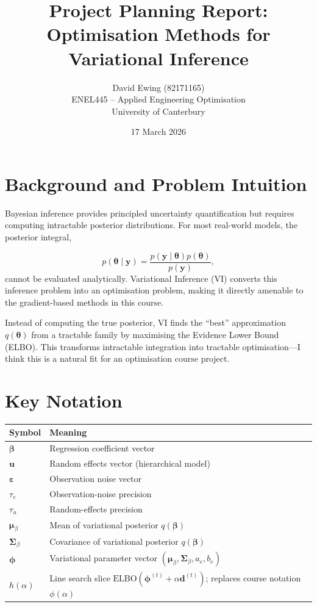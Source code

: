 \documentclass[11pt]{article}
\title{Project Planning Report:\\
Optimisation Methods for Variational Inference}
\author{David Ewing (82171165)\\
ENEL445 -- Applied Engineering Optimisation\\
University of Canterbury}
\date{17 March 2026}
\begin{document}
\maketitle

\section*{Background and Problem Intuition}

 

Bayesian inference provides principled uncertainty quantification but requires computing intractable posterior distributions. For most real-world models, the posterior integral, \par

\begin{equation*}
    p(\bm{\theta} \mid \bm{y}) = \frac{p(\bm{y} \mid \bm{\theta})p(\bm{\theta})}{p(\bm{y})},
\end{equation*}
\noindent 
cannot be evaluated analytically. Variational Inference (VI) converts this inference problem into an optimisation problem, making it directly amenable to the gradient-based methods in this course. \vspace{2em}

 

Instead of computing the true posterior, VI finds the ``best'' approximation $q(\bm{\theta})$ from a tractable family by maximising the Evidence Lower Bound (ELBO). This transforms intractable integration into tractable optimisation---I think this is a natural fit for an optimisation course project.

\section*{Key Notation}

\begin{center}
\begin{tabular}{ll}
\hline
\textbf{Symbol} & \textbf{Meaning} \\
\hline
$\bm{\beta}$ & Regression coefficient vector \\
$\bm{u}$ & Random effects vector (hierarchical model) \\
$\bm{\varepsilon}$ & Observation noise vector \\
$\tau_e$ & Observation-noise precision \\
$\tau_u$ & Random-effects precision \\
$\bm{\mu}_\beta$ & Mean of variational posterior $q(\bm{\beta})$ \\
$\bm{\Sigma}_\beta$ & Covariance of variational posterior $q(\bm{\beta})$ \\
$\bm{\phi}$ & Variational parameter vector $(\bm{\mu}_\beta, \bm{\Sigma}_\beta, a_e, b_e)$ \\
$h(\alpha)$ & Line search slice $\text{ELBO}(\bm{\phi}^{(t)} + \alpha\bm{d}^{(t)})$; replaces course notation $\phi(\alpha)$ \\
\hline
\end{tabular}
\end{center}
\newpage
\end{document}
